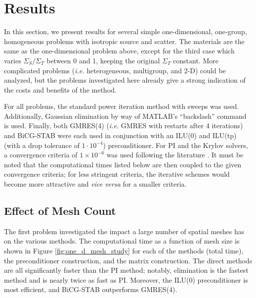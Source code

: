 \documentclass[final,3p,times,11pt]{elsarticle}
\newcommand{\ie}{{\it i.e. }}
\begin{document}
% 

\section{Results}

  In this section, we present results for several simple one-dimensional, one-group, homogeneous problems with isotropic source and scatter.  The materials are the same as the one-dimensional problem above, except for the third case which varies $\Sigma_S/\Sigma_T$ between 0 and 1, keeping the original $\Sigma_T$ constant.  More complicated problems (\ie heterogeneous, multigroup, and 2-D) could be analyzed, but the problems investigated here already give a strong indication of the costs and benefits of the method.

  For all problems, the standard power iteration method with sweeps was used.  Additionally, Gaussian elimination by way of MATLAB's ``backslash'' command is used.  Finally, both GMRES(4) (\ie GMRES with restarts after 4 iterations) and BiCG-STAB were each used in conjunction with an ILU(0) and ILU(tp) (with a drop tolerance of $1\cdot10^{-4}$) preconditioner.  For PI and the Krylov solvers, a convergence criteria of $1\times 10^{-6}$ was used following the literature \cite{patton2002apg}.  It must be noted that the computational times listed below are then coupled to the given convergence criteria; for less stringent criteria, the iterative schemes would become more attractive and {\it vice versa} for a smaller criteria.
 
\subsection{Effect of Mesh Count}

  The first problem investigated the impact a large number of spatial meshes has on the various methods.  The computational time as a function of mesh size is shown in Figure \ref{fig:one_d_mesh_study} for each of the methods (total time), the preconditioner construction, and the matrix construction.  The direct methods are all significantly faster than the PI method; notably, elimination is the fastest method and is nearly twice as fast as PI.  Moreover, the ILU(0) preconditioner is most efficient, and BiCG-STAB outperforms GMRES(4).
\end{document}
